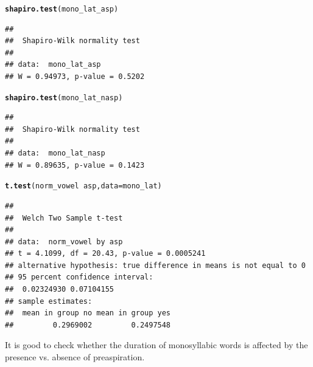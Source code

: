 \documentclass[a4paper,11pt]{article}\usepackage[]{graphicx}\usepackage[]{color}
\makeatletter
\newcommand{\hlopt}[1]{\textcolor[rgb]{0,0,0}{#1}}%
\newcommand{\hlstd}[1]{\textcolor[rgb]{0.345,0.345,0.345}{#1}}%
\newcommand{\hlkwc}[1]{\textcolor[rgb]{0.333,0.667,0.333}{#1}}%
\newcommand{\hlkwd}[1]{\textcolor[rgb]{0.737,0.353,0.396}{\textbf{#1}}}%
\newenvironment{kframe}{%
 \def\at@end@of@kframe{}%
 \ifinner\ifhmode%
  \def\at@end@of@kframe{\end{minipage}}%
  \begin{minipage}{\columnwidth}%
 \fi\fi%
 \def\FrameCommand##1{\hskip\@totalleftmargin \hskip-\fboxsep
 \colorbox{shadecolor}{##1}\hskip-\fboxsep
     \hskip-\linewidth \hskip-\@totalleftmargin \hskip\columnwidth}%
 \MakeFramed {\advance\hsize-\width
   \@totalleftmargin\z@ \linewidth\hsize
   \@setminipage}}%
 {\par\unskip\endMakeFramed%
 \at@end@of@kframe}
\newenvironment{knitrout}{}{} %
\makeatother
\begin{document}
\begin{knitrout}
\color{fgcolor}\begin{kframe}
\begin{alltt}
\hlkwd{shapiro.test}\hlstd{(mono_lat_asp)}
\end{alltt}
\begin{verbatim}
## 
## 	Shapiro-Wilk normality test
## 
## data:  mono_lat_asp
## W = 0.94973, p-value = 0.5202
\end{verbatim}
\begin{alltt}
\hlkwd{shapiro.test}\hlstd{(mono_lat_nasp)}
\end{alltt}
\begin{verbatim}
## 
## 	Shapiro-Wilk normality test
## 
## data:  mono_lat_nasp
## W = 0.89635, p-value = 0.1423
\end{verbatim}
\begin{alltt}
\hlkwd{t.test}\hlstd{(norm_vowel} \hlopt{~} \hlstd{asp,} \hlkwc{data} \hlstd{= mono_lat)}
\end{alltt}
\begin{verbatim}
## 
## 	Welch Two Sample t-test
## 
## data:  norm_vowel by asp
## t = 4.1099, df = 20.43, p-value = 0.0005241
## alternative hypothesis: true difference in means is not equal to 0
## 95 percent confidence interval:
##  0.02324930 0.07104155
## sample estimates:
##  mean in group no mean in group yes 
##         0.2969002         0.2497548
\end{verbatim}
\end{kframe}
\end{knitrout}

It is good to check whether the duration of monosyllabic words is affected by the presence vs. absence of preaspiration.
\end{document}
